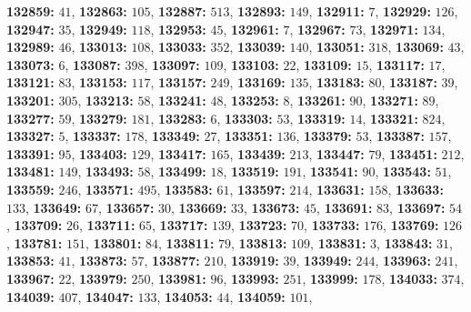 \textsf{\bfseries 132859:} $41$, \textsf{\bfseries 132863:} $105$, \textsf{\bfseries 132887:} $513$, \textsf{\bfseries 132893:} $149$, \textsf{\bfseries 132911:} $7$, \textsf{\bfseries 132929:} $126$, \textsf{\bfseries 132947:} $35$, \textsf{\bfseries 132949:} $118$, \textsf{\bfseries 132953:} $45$, \textsf{\bfseries 132961:} $7$, \textsf{\bfseries 132967:} $73$, \textsf{\bfseries 132971:} $134$, \textsf{\bfseries 132989:} $46$, \textsf{\bfseries 133013:} $108$, \textsf{\bfseries 133033:} $352$, \textsf{\bfseries 133039:} $140$, \textsf{\bfseries 133051:} $318$, \textsf{\bfseries 133069:} $43$, \textsf{\bfseries 133073:} $6$, \textsf{\bfseries 133087:} $398$, \textsf{\bfseries 133097:} $109$, \textsf{\bfseries 133103:} $22$, \textsf{\bfseries 133109:} $15$, \textsf{\bfseries 133117:} $17$, \textsf{\bfseries 133121:} $83$, \textsf{\bfseries 133153:} $117$, \textsf{\bfseries 133157:} $249$, \textsf{\bfseries 133169:} $135$, \textsf{\bfseries 133183:} $80$, \textsf{\bfseries 133187:} $39$, \textsf{\bfseries 133201:} $305$, \textsf{\bfseries 133213:} $58$, \textsf{\bfseries 133241:} $48$, \textsf{\bfseries 133253:} $8$, \textsf{\bfseries 133261:} $90$, \textsf{\bfseries 133271:} $89$, \textsf{\bfseries 133277:} $59$, \textsf{\bfseries 133279:} $181$, \textsf{\bfseries 133283:} $6$, \textsf{\bfseries 133303:} $53$, \textsf{\bfseries 133319:} $14$, \textsf{\bfseries 133321:} $824$, \textsf{\bfseries 133327:} $5$, \textsf{\bfseries 133337:} $178$, \textsf{\bfseries 133349:} $27$, \textsf{\bfseries 133351:} $136$, \textsf{\bfseries 133379:} $53$, \textsf{\bfseries 133387:} $157$, \textsf{\bfseries 133391:} $95$, \textsf{\bfseries 133403:} $129$, \textsf{\bfseries 133417:} $165$, \textsf{\bfseries 133439:} $213$, \textsf{\bfseries 133447:} $79$, \textsf{\bfseries 133451:} $212$, \textsf{\bfseries 133481:} $149$, \textsf{\bfseries 133493:} $58$, \textsf{\bfseries 133499:} $18$, \textsf{\bfseries 133519:} $191$, \textsf{\bfseries 133541:} $90$, \textsf{\bfseries 133543:} $51$, \textsf{\bfseries 133559:} $246$, \textsf{\bfseries 133571:} $495$, \textsf{\bfseries 133583:} $61$, \textsf{\bfseries 133597:} $214$, \textsf{\bfseries 133631:} $158$, \textsf{\bfseries 133633:} $133$, \textsf{\bfseries 133649:} $67$, \textsf{\bfseries 133657:} $30$, \textsf{\bfseries 133669:} $33$, \textsf{\bfseries 133673:} $45$, \textsf{\bfseries 133691:} $83$, \textsf{\bfseries 133697:} $54$, \textsf{\bfseries 133709:} $26$, \textsf{\bfseries 133711:} $65$, \textsf{\bfseries 133717:} $139$, \textsf{\bfseries 133723:} $70$, \textsf{\bfseries 133733:} $176$, \textsf{\bfseries 133769:} $126$, \textsf{\bfseries 133781:} $151$, \textsf{\bfseries 133801:} $84$, \textsf{\bfseries 133811:} $79$, \textsf{\bfseries 133813:} $109$, \textsf{\bfseries 133831:} $3$, \textsf{\bfseries 133843:} $31$, \textsf{\bfseries 133853:} $41$, \textsf{\bfseries 133873:} $57$, \textsf{\bfseries 133877:} $210$, \textsf{\bfseries 133919:} $39$, \textsf{\bfseries 133949:} $244$, \textsf{\bfseries 133963:} $241$, \textsf{\bfseries 133967:} $22$, \textsf{\bfseries 133979:} $250$, \textsf{\bfseries 133981:} $96$, \textsf{\bfseries 133993:} $251$, \textsf{\bfseries 133999:} $178$, \textsf{\bfseries 134033:} $374$, \textsf{\bfseries 134039:} $407$, \textsf{\bfseries 134047:} $133$, \textsf{\bfseries 134053:} $44$, \textsf{\bfseries 134059:} $101$, 
